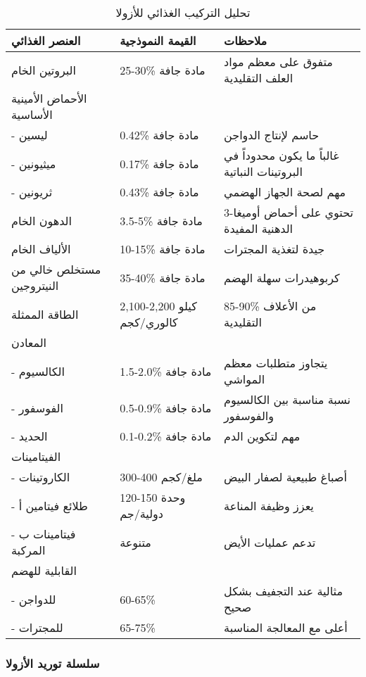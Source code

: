 \begin{table}[h]
\centering
\caption{تحليل التركيب الغذائي للأزولا}
\label{tab:azolla_nutrition}
\begin{tabular}{|p{4cm}|p{3cm}|p{5cm}|}
\hline
\textbf{العنصر الغذائي} & \textbf{القيمة النموذجية} & \textbf{ملاحظات} \\
\hline
البروتين الخام & 25-30\% مادة جافة & متفوق على معظم مواد العلف التقليدية \\
\hline
الأحماض الأمينية الأساسية & & \\
- ليسين & 0.42\% مادة جافة & حاسم لإنتاج الدواجن \\
- ميثيونين & 0.17\% مادة جافة & غالباً ما يكون محدوداً في البروتينات النباتية \\
- ثريونين & 0.43\% مادة جافة & مهم لصحة الجهاز الهضمي \\
\hline
الدهون الخام & 3.5-5\% مادة جافة & تحتوي على أحماض أوميغا-3 الدهنية المفيدة \\
\hline
الألياف الخام & 10-15\% مادة جافة & جيدة لتغذية المجترات \\
\hline
مستخلص خالي من النيتروجين & 35-40\% مادة جافة & كربوهيدرات سهلة الهضم \\
\hline
الطاقة الممثلة & 2,100-2,200 كيلو كالوري/كجم & 85-90\% من الأعلاف التقليدية \\
\hline
المعادن & & \\
- الكالسيوم & 1.5-2.0\% مادة جافة & يتجاوز متطلبات معظم المواشي \\
- الفوسفور & 0.5-0.9\% مادة جافة & نسبة مناسبة بين الكالسيوم والفوسفور \\
- الحديد & 0.1-0.2\% مادة جافة & مهم لتكوين الدم \\
\hline
الفيتامينات & & \\
- الكاروتينات & 300-400 ملغ/كجم & أصباغ طبيعية لصفار البيض \\
- طلائع فيتامين أ & 120-150 وحدة دولية/جم & يعزز وظيفة المناعة \\
- فيتامينات ب المركبة & متنوعة & تدعم عمليات الأيض \\
\hline
القابلية للهضم & & \\
- للدواجن & 60-65\% & مثالية عند التجفيف بشكل صحيح \\
- للمجترات & 65-75\% & أعلى مع المعالجة المناسبة \\
\hline
\end{tabular}
\end{table}

\subsubsection{سلسلة توريد الأزولا}
\label{sec:azolla_supply}

